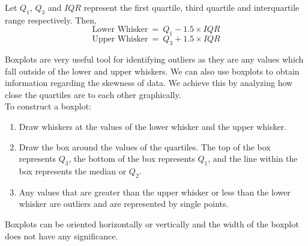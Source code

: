 \begin{definition}
Let $Q_{1}$, $Q_{3}$ and $IQR$ represent the first quartile, third quartile and 
interquartile range respectively. Then,
\[ \text{Lower Whisker} ~ = ~ Q_{1} - 1.5 \times IQR \]
\[ \text{Upper Whisker} ~ = ~ Q_{3} + 1.5 \times IQR \]
\end{definition}

\noindent
Boxplots are very useful tool for identifying outliers as they are any values which fall outside of the lower and upper whiskers. We can also use boxplots to obtain information regarding the skewness of data. We achieve this by analyzing how close the quartiles are to each other graphically.\\

\noindent
To construct a boxplot:
\begin{enumerate}
\item Draw whiskers at the values
of the lower whisker and the upper whisker.
\item Draw the box around the values of the quartiles. The top of the box represents $Q_3$, the bottom of the box represents $Q_1$, and the line within the box represents the median or $Q_2$.
\item Any values that are greater than the upper whisker or less than the lower whisker are outliers and are represented by single points.
\end{enumerate}

\begin{nt}
Boxplots can be oriented horizontally or vertically and the width of the boxplot does not have any significance.
\end{nt}

